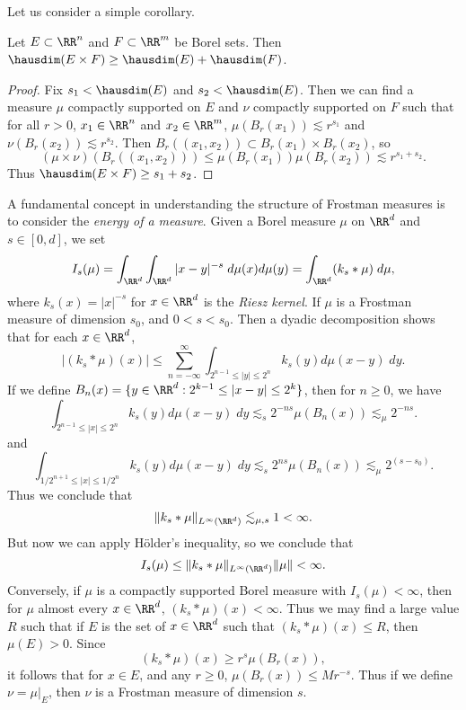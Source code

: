 Let us consider a simple corollary.

\begin{corollary}
	Let $E \subset \RR^n$ and $F \subset \RR^m$ be Borel sets. Then $\hausdim(E \times F) \geq \hausdim(E) + \hausdim(F)$.
\end{corollary}
\begin{proof}
	Fix $s_1 < \hausdim(E)$ and $s_2 < \hausdim(E)$. Then we can find a measure $\mu$ compactly supported on $E$ and $\nu$ compactly supported on $F$ such that for all $r > 0$, $x_1 \in \RR^n$ and $x_2 \in \RR^m$, $\mu(B_r(x_1)) \lesssim r^{s_1}$ and $\nu(B_r(x_2)) \lesssim r^{s_2}$. Then $B_r((x_1,x_2)) \subset B_r(x_1) \times B_r(x_2)$, so
	\[ (\mu \times \nu)(B_r((x_1,x_2))) \leq \mu(B_r(x_1)) \mu(B_r(x_2)) \lesssim r^{s_1 + s_2}. \]
	Thus $\hausdim(E \times F) \geq s_1 + s_2$.
\end{proof}

A fundamental concept in understanding the structure of Frostman measures is to consider the \emph{energy of a measure}. Given a Borel measure $\mu$ on $\RR^d$ and $s \in [0,d]$, we set
%
\[ I_s(\mu) = \int_{\RR^d} \int_{\RR^d} |x - y|^{-s}\; d\mu(x) d\mu(y) = \int_{\RR^d} (k_s * \mu)\; d\mu, \]
%
where $k_s(x) = |x|^{-s}$ for $x \in \RR^d$ is the \emph{Riesz kernel}. If $\mu$ is a Frostman measure of dimension $s_0$, and $0 < s < s_0$. Then a dyadic decomposition shows that for each $x \in \RR^d$,
%
\[ |(k_s * \mu)(x)| \leq \sum_{n = -\infty}^\infty \int_{2^{n-1} \leq |y| \leq 2^n} k_s(y) d\mu(x-y)\; dy. \]
%
If we define $B_n(x) = \{ y \in \RR^d: 2^{k-1} \leq |x-y| \leq 2^k \}$, then for $n \geq 0$, we have
%
\[ \int_{2^{n-1} \leq |x| \leq 2^n} k_s(y) d\mu(x-y)\; dy \lesssim_s 2^{-ns} \mu(B_n(x)) \lesssim_\mu 2^{-ns}. \]
%
and
%
\[ \int_{1/2^{n+1} \leq |x| \leq 1/2^n} k_s(y) d\mu(x-y)\; dy \lesssim_s 2^{ns} \mu(B_n(x)) \lesssim_\mu 2^{(s - s_0)}. \]
%
Thus we conclude that
%
\[ \| k_s * \mu \|_{L^\infty(\RR^d)} \lesssim_{\mu,s} 1 < \infty. \]
%
But now we can apply H\"{o}lder's inequality, so we conclude that
%
\[ I_s(\mu) \leq \| k_s * \mu \|_{L^\infty(\RR^d)} \| \mu \| < \infty. \]
%
Conversely, if $\mu$ is a compactly supported Borel measure with $I_s(\mu) < \infty$, then for $\mu$ almost every $x \in \RR^d$, $(k_s * \mu)(x) < \infty$. Thus we may find a large value $R$ such that if $E$ is the set of $x \in \RR^d$ such that $(k_s * \mu)(x) \leq R$, then $\mu(E) > 0$. Since
%
\[ (k_s * \mu)(x) \geq r^s \mu(B_r(x)), \]
%
it follows that for $x \in E$, and any $r \geq 0$, $\mu(B_r(x)) \leq M r^{-s}$. Thus if we define $\nu = \mu|_E$, then $\nu$ is a Frostman measure of dimension $s$.

